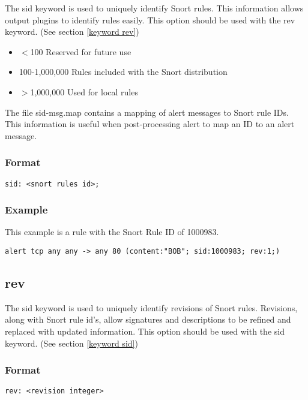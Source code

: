 \documentclass[english]{report}
\begin{document}
The sid keyword is used to uniquely identify Snort rules. This information
allows output plugins to identify rules easily.  This option should be used
with the rev keyword.  (See section \ref{keyword rev})

\begin{itemize}
\item $<$100 Reserved for future use
\item 100-1,000,000 Rules included with the Snort distribution
\item $>$1,000,000 Used for local rules
\end{itemize}

The file sid-msg.map contains a mapping of alert messages to Snort rule IDs.
This information is useful when post-processing alert to map an ID to an alert
message.  

\subsubsection{Format}

\begin{verbatim}
sid: <snort rules id>;
\end{verbatim}

\subsubsection{Example}
This example is a rule with the Snort Rule ID of 1000983.
\begin{verbatim}
alert tcp any any -> any 80 (content:"BOB"; sid:1000983; rev:1;)
\end{verbatim}

\subsection{rev \label{keyword rev}}

The sid keyword is used to uniquely identify revisions of Snort rules.
Revisions, along with Snort rule id's, allow signatures and descriptions to be
refined and replaced with updated information.  This option should be used with
the sid keyword.  (See section \ref{keyword sid})

\subsubsection{Format}

\begin{verbatim}
rev: <revision integer>
\end{verbatim}
\end{document}
